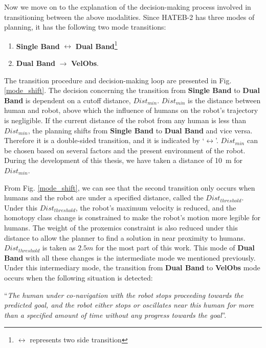 Now we move on to the explanation of the decision-making process involved in transitioning between the above modalities. Since HATEB-2 has three modes of planning, it has the following two mode transitions: 
\begin{enumerate}
    \item \textbf{Single Band} $\leftrightarrow$ \textbf{Dual Band}\footnote{$\leftrightarrow$ represents two side transition}
    \item \textbf{Dual Band} $\rightarrow$ \textbf{VelObs}.
\end{enumerate}

The transition procedure and decision-making loop are presented in Fig. \ref{mode_shift}. The decision concerning the transition from \textbf{Single Band} to \textbf{Dual Band} is dependent on a cutoff distance, $Dist_{min}$. $Dist_{min}$ is the distance between human and robot, above which the influence of humans on the robot's trajectory is negligible. If the current distance of the robot from any human is less than $Dist_{min}$, the planning shifts from \textbf{Single Band} to \textbf{Dual Band} and vice versa. Therefore it is a double-sided transition, and it is indicated by `$\leftrightarrow$'. $Dist_{min}$ can be chosen based on several factors and the present environment of the robot. During the development of this thesis, we have taken a distance of \SI{10}{\metre} for $Dist_{min}$.

From Fig. \ref{mode_shift}, we can see that the second transition only occurs when humans and the robot are under a specified distance, called the $Dist_{threshold}$. Under this $Dist_{threshold}$, the robot's maximum velocity is reduced, and the homotopy class change is constrained to make the robot's motion more legible for humans. The weight of the proxemics constraint is also reduced under this distance to allow the planner to find a solution in near proximity to humans. $Dist_{threshold}$ is taken as $2.5m$ for the most part of this work. This mode of \textbf{Dual Band} with all these changes is the intermediate mode we mentioned previously. Under this intermediary mode, the transition from \textbf{Dual Band} to \textbf{VelObs} mode occurs when the following situation is detected:

``\textit{The human under co-navigation with the robot stops proceeding towards the predicted goal, and the robot either stops or oscillates near this human for more than a specified amount of time without any progress towards the goal}''.


